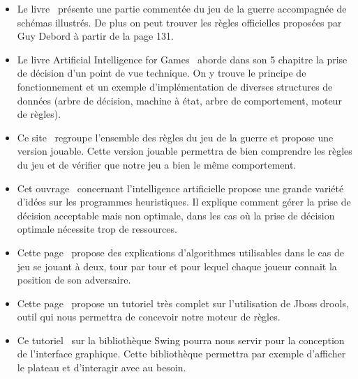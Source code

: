 \documentclass[12pt]{article}
\begin{document}
		\begin{itemize}
		
		\item Le livre~\cite{ref1} présente une partie commentée du jeu de la guerre accompagnée de schémas illustrés. 
		De plus on peut trouver les règles officielles proposées par Guy Debord à partir de la page 131.
		\\[0.7\baselineskip]
		
		\item Le livre Artificial Intelligence for Games~\cite{ref2} aborde dans son 5 chapitre la prise de décision d'un point de vue technique. 
		On y trouve le principe de fonctionnement et un exemple d'implémentation de diverses structures de données (arbre de décision, machine à état, 
		arbre de comportement, moteur de règles).
		\\[0.7\baselineskip]

		\item Ce site~\cite{ref3} regroupe l'ensemble des règles du jeu de la guerre et propose une version jouable. Cette version jouable permettra 
		de bien comprendre les règles du jeu et de vérifier que notre jeu a bien le même comportement.
		\\[0.7\baselineskip]
	
		\item Cet ouvrage~\cite{ref4} concernant l'intelligence artificielle propose une grande variété d'idées sur les programmes heuristiques. 
		Il explique comment gérer la prise de décision acceptable mais non optimale, dans les cas où la prise de décision optimale nécessite trop de ressources.
		\\[0.7\baselineskip]
		
		\item Cette page~\cite{ref5} propose des explications d'algorithmes utilisables dans le cas de jeu se jouant à deux, tour par tour et 
		pour lequel chaque joueur connait la position de son adversaire.
		\\[0.7\baselineskip]
		
		\item Cette page~\cite{ref6} propose un tutoriel très complet sur l'utilisation de Jboss drools, outil qui nous permettra de concevoir notre moteur de règles.
		\\[0.7\baselineskip]
		
		\item Ce tutoriel~\cite{ref7} sur la bibliothèque Swing pourra nous servir pour la conception de l'interface graphique. Cette bibliothèque 
		permettra par exemple d'afficher le plateau et d'interagir avec au besoin.
		\\[0.7\baselineskip]
		
		\end{itemize}
		
		
		{}
\end{document}
